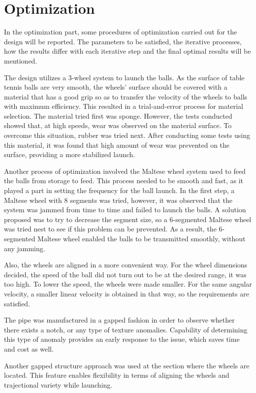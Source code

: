 \documentclass[12pt]{report}
\begin{document}
\section{Optimization}
In the optimization part, some procedures of optimization carried out for the design will be reported. The parameters to be satisfied, the iterative processes, how the results differ with each iterative step and the final optimal results will be mentioned.

The design utilizes a 3-wheel system to launch the balls. As the surface of table tennis balls are very smooth, the wheels’ surface should be covered with a material that has a good grip so as to transfer the velocity of the wheels to balls with maximum efficiency. This resulted in a trial-and-error process for material selection. The material tried first was sponge. However, the tests conducted showed that, at high speeds, wear was observed on the material surface. To overcome this situation, rubber was tried next. After conducting some tests using this material, it was found that high amount of wear was prevented on the surface, providing a more stabilized launch. 

Another process of optimization involved the Maltese wheel system used to feed the balls from storage to feed. This process needed to be smooth and fast, as it played a part in setting the frequency for the ball launch. In the first step, a Maltese wheel with 8 segments was tried, however, it was observed that the system was jammed from time to time and failed to launch the balls. A solution proposed was to try to decrease the segment size, so a 6-segmented Maltese wheel was tried nest to see if this problem can be prevented. As a result, the 6-segmented Maltese wheel enabled the balls to be transmitted smoothly, without any jamming. 

Also, the wheels are aligned in a more convenient way. For the wheel dimensions decided, the speed of the ball did not turn out to be at the desired range, it was too high. To lower the speed, the wheels were made smaller. For the same angular velocity, a smaller linear velocity is obtained in that way, so the requirements are satisfied.

The pipe was manufactured in a gapped fashion in order to observe whether there exists a notch, or any type of texture anomalies. Capability of determining this type of anomaly provides an early response to the issue, which saves time and cost as well. 

Another gapped structure approach was used at the section where the wheels are located. This feature enables flexibility in terms of aligning the wheels and trajectional variety while launching.  
\end{document}
